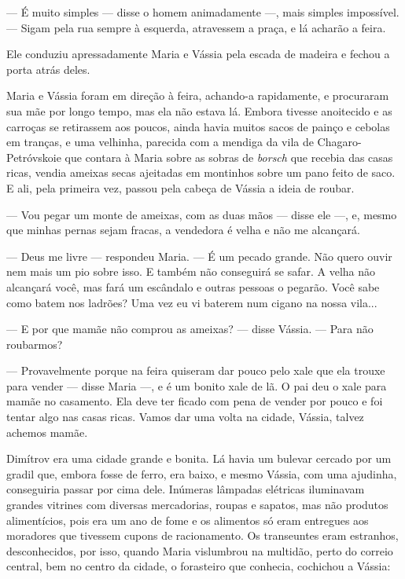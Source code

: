 --- É muito simples --- disse o homem animadamente ---, mais simples
impossível. --- Sigam pela rua sempre à esquerda, atravessem a praça, e
lá acharão a feira.

Ele conduziu apressadamente Maria e Vássia pela escada de madeira e
fechou a porta atrás deles.

Maria e Vássia foram em direção à feira, achando-a rapidamente, e
procuraram sua mãe por longo tempo, mas ela não estava lá. Embora
tivesse anoitecido e as carroças se retirassem aos poucos, ainda havia
muitos sacos de painço e cebolas em tranças, e uma velhinha, parecida
com a mendiga da vila de Chagaro-Petróvskoie que contara à Maria sobre
as sobras de \emph{borsch} que recebia das casas ricas, vendia ameixas
secas ajeitadas em montinhos sobre um pano feito de saco. E ali, pela
primeira vez, passou pela cabeça de Vássia a ideia de roubar.

--- Vou pegar um monte de ameixas, com as duas mãos --- disse ele ---,
e, mesmo que minhas pernas sejam fracas, a vendedora é velha e não me
alcançará.

--- Deus me livre --- respondeu Maria. --- É um pecado grande. Não quero
ouvir nem mais um pio sobre isso. E também não conseguirá se safar. A
velha não alcançará você, mas fará um escândalo e outras pessoas o
pegarão. Você sabe como batem nos ladrões? Uma vez eu vi baterem num
cigano na nossa vila...

--- E por que mamãe não comprou as ameixas? --- disse Vássia. --- Para
não roubarmos?

--- Provavelmente porque na feira quiseram dar pouco pelo xale que ela
trouxe para vender --- disse Maria ---, e é um bonito xale de lã. O pai
deu o xale para mamãe no casamento. Ela deve ter ficado com pena de
vender por pouco e foi tentar algo nas casas ricas. Vamos dar uma volta
na cidade, Vássia, talvez achemos mamãe.

Dimítrov era uma cidade grande e bonita. Lá havia um bulevar cercado por
um gradil que, embora fosse de ferro, era baixo, e mesmo Vássia, com uma
ajudinha, conseguiria passar por cima dele. Inúmeras lâmpadas elétricas
iluminavam grandes vitrines com diversas mercadorias, roupas e sapatos,
mas não produtos alimentícios, pois era um ano de fome e os alimentos só
eram entregues aos moradores que tivessem cupons de racionamento. Os
transeuntes eram estranhos, desconhecidos, por isso, quando Maria
vislumbrou na multidão, perto do correio central, bem no centro da
cidade, o forasteiro que conhecia, cochichou a Vássia:

